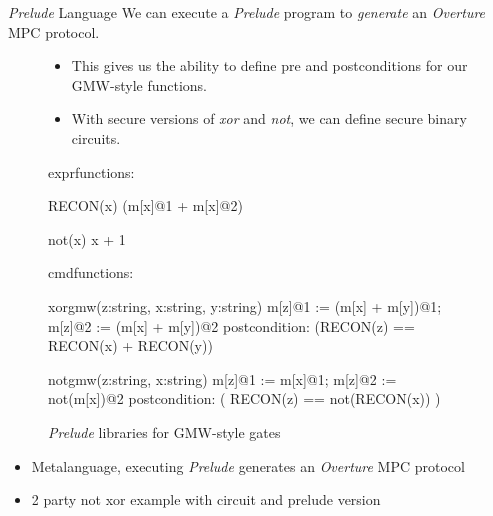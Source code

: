 \documentclass{beamer}
\begin{document}
\begin{frame}[fragile]{\textit{Prelude} Language}
    We can execute a \textit{Prelude} program to \textit{generate} an \textit{Overture} MPC protocol.
    \begin{figure}
        \begin{minipage}[t]{.5\textwidth}
            \begin{itemize}
                \item This gives us the ability to define pre and postconditions for our GMW-style functions.
                \item With secure versions of \textit{xor} and \textit{not}, we can define secure binary circuits.
            \end{itemize}
            \end{minipage}%
            \begin{minipage}[t]{.5\textwidth}
                    {\scriptsize
                    \begin{verbatimtab}
exprfunctions:

RECON(x) { (m[x]@1 + m[x]@2) }

not(x){ x + 1 }

cmdfunctions:

xorgmw(z:string, x:string, y:string) {
    m[z]@1 := (m[x] + m[y])@1; 
    m[z]@2 := (m[x] + m[y])@2
} 
postcondition: (RECON(z) == 
                RECON(x) + RECON(y))

notgmw(z:string, x:string) {
    m[z]@1 := m[x]@1;
    m[z]@2 := not(m[x])@2
}
postcondition: ( RECON(z) == 
                not(RECON(x)) )
                    \end{verbatimtab}
                    }
                    \caption{\textit{Prelude} libraries for GMW-style gates}
                    \label{fig-prelude-gmw}
                \end{minipage}
    \end{figure}
    \begin{itemize}
    \item Metalanguage, executing \textit{Prelude} generates an \textit{Overture} MPC protocol\\
    \item 2 party not xor example with circuit and prelude version\\
    \end{itemize}
\end{frame}
\end{document}
